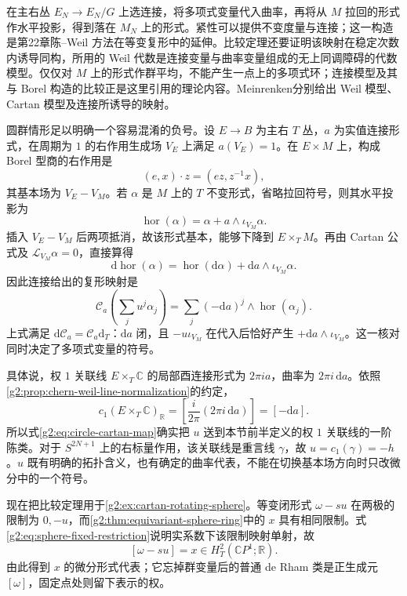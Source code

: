 \ProseParagraphBreak
在主右丛 \(E_N\to E_N/G\) 上选连接，将多项式变量代入曲率，再将从 \(M\) 拉回的形式作水平投影，得到落在 \(M_N\) 上的形式。紧性可以提供不变度量与连接；这一构造是第22章陈--Weil 方法在等变复形中的延伸。比较定理还要证明该映射在稳定次数内诱导同构，所用的 Weil 代数是连接变量与曲率变量组成的无上同调障碍的代数模型。仅仅对 \(M\) 上的形式作群平均，不能产生一点上的多项式环；连接模型及其与 Borel 构造的比较正是这里引用的理论内容。Meinrenken\cite[\S\S5--7]{Meinrenken2006EquivariantCartan}分别给出 Weil 模型、Cartan 模型及连接所诱导的映射。

\ProseParagraphBreak
圆群情形足以明确一个容易混淆的负号。设 \(E\to B\) 为主右 \(T\) 丛，\(a\) 为实值连接形式，在周期为 \(1\) 的右作用生成场 \(V_E\) 上满足 \(a(V_E)=1\)。在 \(E\times M\) 上，构成 Borel 型商的右作用是
\[
	(e,x)\cdot z=(ez,z^{-1}x),
\]
其基本场为 \(V_E-V_M\)。若 \(\alpha\) 是 \(M\) 上的 \(T\) 不变形式，省略拉回符号，则其水平投影为
\[
	\operatorname{hor}(\alpha)=\alpha+a\wedge\iota_{V_M}\alpha.
\]
插入 \(V_E-V_M\) 后两项抵消，故该形式基本，能够下降到 \(E\times_T M\)。再由 Cartan 公式及 \(\mathcal L_{V_M}\alpha=0\)，直接算得
\[
	\mathrm d\operatorname{hor}(\alpha)=\operatorname{hor}(\mathrm d\alpha)+\mathrm da\wedge\iota_{V_M}\alpha.
\]
因此连接给出的复形映射是
\begin{equation}\label{g2:eq:circle-cartan-map}
	\mathcal C_a\left(\sum_j u^j\alpha_j\right)
	=\sum_j(-\mathrm da)^j\wedge\operatorname{hor}(\alpha_j).
\end{equation}
上式满足 \(\mathrm d\mathcal C_a=\mathcal C_a\mathrm d_T\)：\(\mathrm da\) 闭，且 \(-u\iota_{V_M}\) 在代入后恰好产生 \(+\mathrm da\wedge\iota_{V_M}\)。这一核对同时决定了多项式变量的符号。

\ProseParagraphBreak
具体说，权 \(1\) 关联线 \(E\times_T\mathbb C\) 的局部酉连接形式为 \(2\pi i a\)，曲率为 \(2\pi i\,\mathrm da\)。依照\cref{g2:prop:chern-weil-line-normalization}的约定，
\begin{equation}\label{g2:eq:equivariant-u-curvature}
	c_1(E\times_T\mathbb C)_{\mathbb R}
	=\left[\frac{i}{2\pi}(2\pi i\,\mathrm da)\right]
	=[-\mathrm da].
\end{equation}
所以式\eqref{g2:eq:circle-cartan-map}确实把 \(u\) 送到本节前半定义的权 \(1\) 关联线的一阶陈类。对于 \(S^{2N+1}\) 上的右标量作用，该关联线是重言线 \(\gamma\)，故 \(u=c_1(\gamma)=-h\)。\(u\) 既有明确的拓扑含义，也有确定的曲率代表，不能在切换基本场方向时只改微分中的一个符号。

\ProseParagraphBreak
现在把比较定理用于\cref{g2:ex:cartan-rotating-sphere}。等变闭形式 \(\omega-su\) 在两极的限制为 \(0,-u\)，而\cref{g2:thm:equivariant-sphere-ring}中的 \(x\) 具有相同限制。式\eqref{g2:eq:sphere-fixed-restriction}说明实系数下该限制映射单射，故
\[
	[\omega-su]=x\in H_T^2(\mathbb CP^1;\mathbb R).
\]
由此得到 \(x\) 的微分形式代表；它忘掉群变量后的普通 de Rham 类是正生成元 \([\omega]\)，固定点处则留下表示的权。

